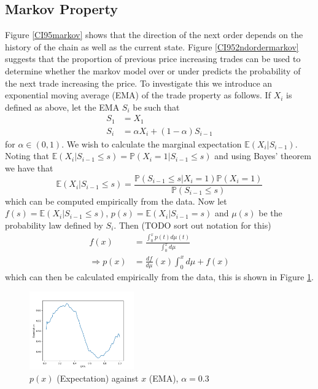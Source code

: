 \documentclass[a4paper,10pt]{article}
\begin{document}
\subsection{Markov Property}
Figure \ref{CI95markov} shows that the direction of the next order depends on the history of the chain as well as the current state. Figure \ref{CI952ndordermarkov} suggests that the proportion of previous price increasing trades can be used to determine whether the markov model over or under predicts the probability of the next trade increasing the price. To investigate this we introduce an exponential moving average (EMA) of the trade property as follows. If $X_i$ is defined as above, let the EMA $S_i$ be such that
\begin{align}
S_1 &= X_1 \\
S_i &= \alpha X_i + (1 - \alpha)S_{i-1}
\end{align}
for $\alpha \in (0, 1)$. We wish to calculate the marginal expectation $\mathbb{E}(X_i | S_{i-1})$. Noting that $\mathbb{E}(X_i | S_{i-1} \leq s) = \mathbb{P}(X_i = 1 | S_{i-1} \leq s)$ and using Bayes' theorem we have that
\begin{equation}
\mathbb{E}(X_i | S_{i-1} \leq s) = \frac{\mathbb{P}(S_{i-1} \leq s | X_i = 1)\mathbb{P}(X_i = 1)}{\mathbb{P}(S_{i-1} \leq s)}
\end{equation}
which can be computed empirically from the data. Now let $f(s) = \mathbb{E}(X_i | S_{i-1} \leq s)$, $p(s) = \mathbb{E}(X_i | S_{i-1} = s)$ and $\mu(s)$ be the probability law defined by $S_i$. Then (TODO sort out notation for this)
\begin{align}
f(x) &= \frac{\int_0^x p(t)d\mu(t)}{\int_0^x d\mu} \\
\Rightarrow p(x) &= \frac{df}{d\mu}(x)\int_0^xd\mu + f(x)
\end{align}
which can then be calculated empirically from the data, this is shown in Figure \ref{probgivenema}.
\begin{figure}[h]
    \centering
    \includegraphics[width=0.4\textwidth]{images/conditional_expectation1}
    \caption{$p(x)$ (Expectation) against $x$ (EMA), $\alpha = 0.3$}
    \label{probgivenema}
\end{figure}
\end{document}

